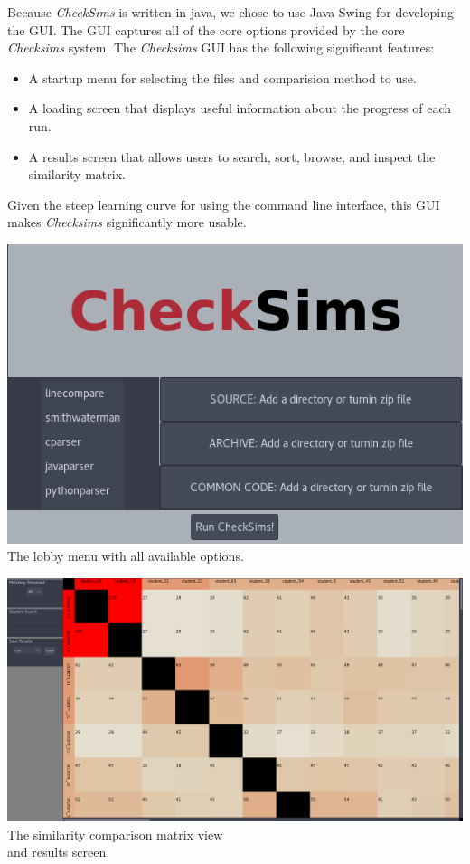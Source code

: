 \documentclass[landscape,a0paper,fontscale=0.285]{baposter}
\begin{document}
\begin{poster}
 {
    Because \textit{CheckSims} is written in java, we chose to use Java Swing for
    developing the GUI. The GUI captures all of the core options provided by the
    core \textit{Checksims} system.
    The \textit{Checksims} GUI has the following significant features:
    \begin{itemize}
    \item A startup menu for selecting the files and comparision method to use.
    \item A loading screen that displays useful information about the progress of
      each run.
    \item A results screen that allows users to search, sort, browse, and inspect
      the similarity matrix.
    \end{itemize}
  
    Given the steep learning curve for using the command line interface, this GUI
    makes \textit{Checksims} significantly more usable.

    \parbox[c][0.35\linewidth][b]{0.48\linewidth}{
      \includegraphics[width=0.9\linewidth]{initial_run.png} \\
      The lobby menu with all available options.
    }
    \parbox[c][0.35\linewidth][b]{0.48\linewidth}{
      \includegraphics[width=0.9\linewidth]{demo_screen.png} \\
      The similarity comparison matrix view \\
      and results screen.
    }
}


\end{poster}
\end{document}

